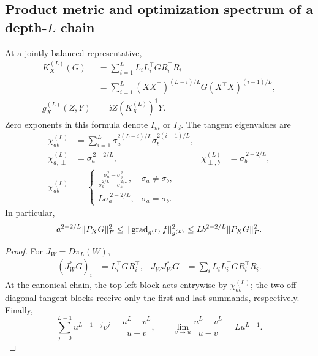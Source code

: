 \subsection{Product metric and optimization spectrum of a depth-$L$ chain}
\begin{theorem}
\label{thm:chain-product-metric}
At a jointly balanced representative,
\begin{align}
K_X^{(L)}(G)
&=\sum_{i=1}^L L_iL_i^\top G R_i^\top R_i\\
&=\sum_{i=1}^L(XX^\top)^{(L-i)/L}
G(X^\top X)^{(i-1)/L},\\
g_X^{(L)}(Z,Y)&=\ii Z{(K_X^{(L)})^\dagger Y}.
\end{align}
Zero exponents in this formula denote $I_m$ or $I_d$.
The tangent eigenvalues are
\begin{align}
\chi_{ab}^{(L)}
&=\sum_{i=1}^L\sigma_a^{2(L-i)/L}\sigma_b^{2(i-1)/L},\\
\chi_{a,\perp}^{(L)}&=\sigma_a^{\,2-2/L},&
\chi_{\perp,b}^{(L)}&=\sigma_b^{\,2-2/L},\\
\chi_{ab}^{(L)}
&=\begin{cases}
\displaystyle\frac{\sigma_a^2-\sigma_b^2}
{\sigma_a^{2/L}-\sigma_b^{2/L}},&\sigma_a\ne\sigma_b,\\
L\sigma_a^{\,2-2/L},&\sigma_a=\sigma_b.
\end{cases}
\label{eq:rigid-chain-metric-spectrum}
\end{align}
In particular,
\begin{equation}
a^{2-2/L}\|P_XG\|_F^2
\leq\|\operatorname{grad}_{g^{(L)}}f\|_{g^{(L)}}^2
\leq Lb^{2-2/L}\|P_XG\|_F^2 .
\end{equation}
\end{theorem}
\begin{proof}
For $J_W=D\pi_L(W)$,
\begin{align}
(J_W^*G)_i&=L_i^\top G R_i^\top,&
J_WJ_W^*G&=\sum_i L_iL_i^\top G R_i^\top R_i .
\end{align}
At the canonical chain, the top-left block acts entrywise by
$\chi_{ab}^{(L)}$; the two off-diagonal tangent blocks receive only the
first and last summands, respectively. Finally,
\begin{equation}
\sum_{j=0}^{L-1}u^{L-1-j}v^j
=\frac{u^L-v^L}{u-v},\qquad
\lim_{v\to u}\frac{u^L-v^L}{u-v}=Lu^{L-1}.
\end{equation}
\end{proof}

